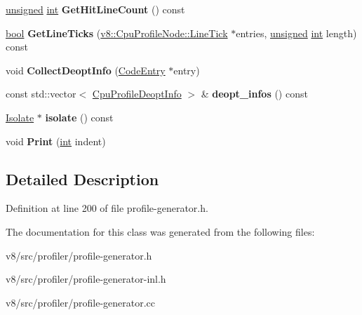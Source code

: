 \begin{DoxyCompactItemize}
\mbox{\hyperlink{classunsigned}{unsigned}} \mbox{\hyperlink{classint}{int}} {\bfseries Get\+Hit\+Line\+Count} () const
\item 
\mbox{\label{classv8_1_1internal_1_1ProfileNode_a869fb932c05c6a408ab54e48cfa1248e}} 
\mbox{\hyperlink{classbool}{bool}} {\bfseries Get\+Line\+Ticks} (\mbox{\hyperlink{structv8_1_1CpuProfileNode_1_1LineTick}{v8\+::\+Cpu\+Profile\+Node\+::\+Line\+Tick}} $\ast$entries, \mbox{\hyperlink{classunsigned}{unsigned}} \mbox{\hyperlink{classint}{int}} length) const
\item 
\mbox{\label{classv8_1_1internal_1_1ProfileNode_aef32ed3f614d3be0712f5386532bd62b}} 
void {\bfseries Collect\+Deopt\+Info} (\mbox{\hyperlink{classv8_1_1internal_1_1CodeEntry}{Code\+Entry}} $\ast$entry)
\item 
\mbox{\label{classv8_1_1internal_1_1ProfileNode_a19c05d119643b6f6ddfe35e96628a075}} 
const std\+::vector$<$ \mbox{\hyperlink{structv8_1_1CpuProfileDeoptInfo}{Cpu\+Profile\+Deopt\+Info}} $>$ \& {\bfseries deopt\+\_\+infos} () const
\item 
\mbox{\label{classv8_1_1internal_1_1ProfileNode_a8649e45e8c47b9b5cb6cbadfed5d4ae5}} 
\mbox{\hyperlink{classv8_1_1internal_1_1Isolate}{Isolate}} $\ast$ {\bfseries isolate} () const
\item 
\mbox{\label{classv8_1_1internal_1_1ProfileNode_a197b95750e6a2103f6b2f87128b84b39}} 
void {\bfseries Print} (\mbox{\hyperlink{classint}{int}} indent)
\end{DoxyCompactItemize}


\subsection{Detailed Description}


Definition at line 200 of file profile-\/generator.\+h.



The documentation for this class was generated from the following files\+:\begin{DoxyCompactItemize}
\item 
v8/src/profiler/profile-\/generator.\+h\item 
v8/src/profiler/profile-\/generator-\/inl.\+h\item 
v8/src/profiler/profile-\/generator.\+cc\end{DoxyCompactItemize}
